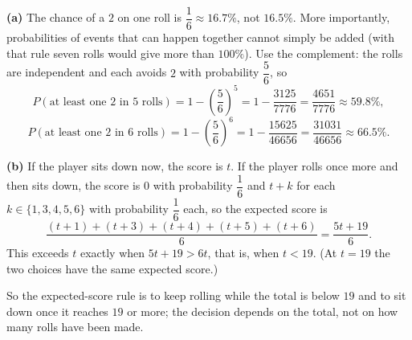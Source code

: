 \textbf{(a)} The chance of a $2$ on one roll is $\dfrac{1}{6}\approx16.7\%$, not $16.5\%$. More importantly, probabilities of events that can happen together cannot simply be added (with that rule seven rolls would give more than $100\%$). Use the complement: the rolls are independent and each avoids $2$ with probability $\dfrac{5}{6}$, so
\[
P(\text{at least one }2\text{ in }5\text{ rolls})=1-\left(\dfrac{5}{6}\right)^5=1-\dfrac{3125}{7776}=\dfrac{4651}{7776}\approx59.8\%,
\]
\[
P(\text{at least one }2\text{ in }6\text{ rolls})=1-\left(\dfrac{5}{6}\right)^6=1-\dfrac{15625}{46656}=\dfrac{31031}{46656}\approx66.5\%.
\]

\textbf{(b)} If the player sits down now, the score is $t$. If the player rolls once more and then sits down, the score is $0$ with probability $\dfrac{1}{6}$ and $t+k$ for each $k\in\{1,3,4,5,6\}$ with probability $\dfrac{1}{6}$ each, so the expected score is
\[
\dfrac{(t+1)+(t+3)+(t+4)+(t+5)+(t+6)}{6}=\dfrac{5t+19}{6}.
\]
This exceeds $t$ exactly when $5t+19>6t$, that is, when $t<19$. (At $t=19$ the two choices have the same expected score.)

So the expected-score rule is to keep rolling while the total is below $19$ and to sit down once it reaches $19$ or more; the decision depends on the total, not on how many rolls have been made.

